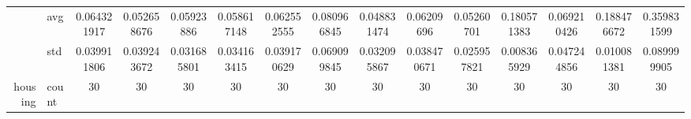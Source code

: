 \begin{table}[htbp]
{\begin{tabular}{rlccc|c|c|c|c|c|ccccc}
			                                                                               & avg                & \cellcolor[rgb]{ 1,  .922,  .518}0.064321917                                   & \cellcolor[rgb]{ .557,  .792,  .49}0.052658676                                 & \cellcolor[rgb]{ .851,  .878,  .506}0.05923886                                 & \cellcolor[rgb]{ .824,  .871,  .506}0.058617148 & \cellcolor[rgb]{ 1,  .922,  .518}0.062552555                                   & \cellcolor[rgb]{ 1,  .89,  .514}0.080966845     & \cellcolor[rgb]{ .388,  .745,  .482}\textcolor[rgb]{ 0,  .38,  0}{0.048831474} & \cellcolor[rgb]{ .976,  .914,  .514}0.06209696  & \cellcolor[rgb]{ .553,  .792,  .49}0.05260701   & \cellcolor[rgb]{ .992,  .722,  .482}0.180571383 & \cellcolor[rgb]{ 1,  .914,  .518}0.069210426    & \cellcolor[rgb]{ .992,  .706,  .478}0.188476672 & \cellcolor[rgb]{ .973,  .412,  .42}0.359831599  \\
			                                                                               & std                & 0.039911806                                                                    & 0.039243672                                                                    & 0.031685801                                                                    & 0.034163415                                     & 0.039170629                                                                    & 0.069099845                                     & 0.032095867                                                                    & 0.038470671                                     & 0.025957821                                     & 0.008365929                                     & 0.047244856                                     & 0.010081381                                     & 0.089999905                                     \\
			housing                                                                        & count              & 30                                                                             & 30                                                                             & 30                                                                             & 30                                              & 30                                                                             & 30                                              & 30                                                                             & 30                                              & 30                                              & 30                                              & 30                                              & 30                                              & 30                                              \\

\end{tabular}}
\end{table}
